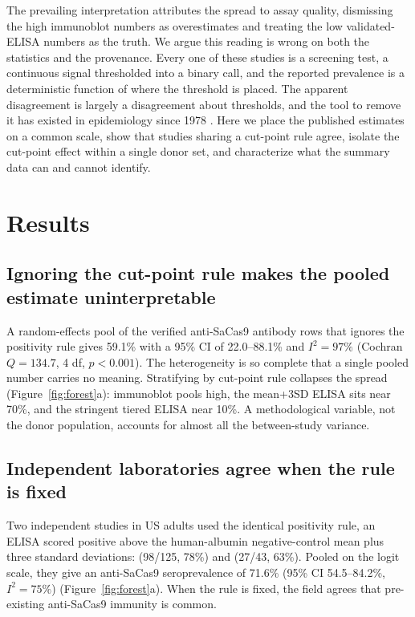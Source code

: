 \documentclass[11pt]{article}
\begin{document}
The prevailing interpretation attributes the spread to assay quality, dismissing the high immunoblot numbers as overestimates and treating the low validated-ELISA numbers as the truth. We argue this reading is wrong on both the statistics and the provenance. Every one of these studies is a screening test, a continuous signal thresholded into a binary call, and the reported prevalence is a deterministic function of where the threshold is placed. The apparent disagreement is largely a disagreement about thresholds, and the tool to remove it has existed in epidemiology since 1978 \citep{rogan1978}. Here we place the published estimates on a common scale, show that studies sharing a cut-point rule agree, isolate the cut-point effect within a single donor set, and characterize what the summary data can and cannot identify.

\section{Results}
\subsection{Ignoring the cut-point rule makes the pooled estimate uninterpretable}
A random-effects pool of the verified anti-SaCas9 antibody rows that ignores the positivity rule gives 59.1\% with a 95\% CI of 22.0--88.1\% and $I^2 = 97\%$ (Cochran $Q = 134.7$, 4 df, $p < 0.001$). The heterogeneity is so complete that a single pooled number carries no meaning. Stratifying by cut-point rule collapses the spread (Figure~\ref{fig:forest}a): immunoblot pools high, the mean+3SD ELISA sits near 70\%, and the stringent tiered ELISA near 10\%. A methodological variable, not the donor population, accounts for almost all the between-study variance.

\subsection{Independent laboratories agree when the rule is fixed}
Two independent studies in US adults used the identical positivity rule, an ELISA scored positive above the human-albumin negative-control mean plus three standard deviations: \citet{charlesworth2019} (98/125, 78\%) and \citet{simhadri2026} (27/43, 63\%). Pooled on the logit scale, they give an anti-SaCas9 seroprevalence of 71.6\% (95\% CI 54.5--84.2\%, $I^2 = 75\%$) (Figure~\ref{fig:forest}a). When the rule is fixed, the field agrees that pre-existing anti-SaCas9 immunity is common.
\end{document}
